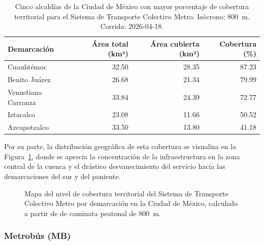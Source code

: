 \begin{table}[H]
    \centering
    \caption[Alcaldías con mayor cobertura del STC Metro (CDMX)]{
    Cinco alcaldías de la Ciudad de México con mayor porcentaje de cobertura
    territorial para el Sistema de Transporte Colectivo Metro. Isócrono: 800~m.
    Corrida: 2026-04-18.}
    \label{tab:cobertura-metro-cdmx}
    \begin{tabular}{|l|r|r|r|}
        \hline
        \textbf{Demarcación} & \textbf{Área total (km²)} & \textbf{Área cubierta (km²)} & \textbf{Cobertura (\%)} \\
        \hline
        Cuauhtémoc          & 32.50 &  28.35 &  87.23 \\
        Benito Juárez       & 26.68 &  21.34 &  79.99 \\
        Venustiano Carranza & 33.84 &  24.39 &  72.77 \\
        Iztacalco           & 23.08 &  11.66 &  50.52 \\
        Azcapotzalco        & 33.50 &  13.80 &  41.18 \\
        \hline
    \end{tabular}
\end{table}

Por su parte, la distribución geográfica de esta cobertura se visualiza en la
Figura~\ref{fig:mapa-cobertura-metro}, donde se aprecia la concentración de la
infraestructura en la zona central de la cuenca y el drástico desvanecimiento del
servicio hacia las demarcaciones del sur y del poniente.

\begin{figure}[H]
    \centering
    \caption[Mapa de cobertura territorial del STC Metro en la CDMX]{Mapa del
    nivel de cobertura territorial del Sistema de Transporte Colectivo Metro
    por demarcación en la Ciudad de México, calculado a partir de 
    de caminata peatonal de 800~m.}
    \label{fig:mapa-cobertura-metro}
\end{figure}

\subsubsection{Metrobús (MB)}
\label{subsubsec:cobertura-mb}


